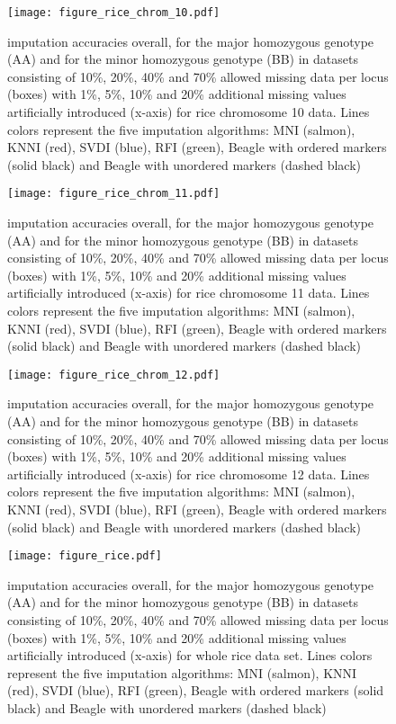 \begin{figure}\texttt{[image: figure\_rice\_chrom\_10.pdf]}\caption{
imputation accuracies overall, for the major homozygous genotype (AA) and for the minor homozygous genotype (BB) in datasets consisting of
10\%, 20\%, 40\% and 70\% allowed missing data per locus (boxes) with 1\%, 5\%, 10\% and 20\%
additional missing values artificially introduced (x-axis) for rice chromosome 10 data.
Lines colors represent the five imputation algorithms: MNI (salmon), KNNI (red), SVDI (blue), RFI (green), Beagle with ordered markers (solid black) and Beagle with unordered markers (dashed black)}\end{figure}
\begin{figure}\texttt{[image: figure\_rice\_chrom\_11.pdf]}\caption{
imputation accuracies overall, for the major homozygous genotype (AA) and for the minor homozygous genotype (BB) in datasets consisting of
10\%, 20\%, 40\% and 70\% allowed missing data per locus (boxes) with 1\%, 5\%, 10\% and 20\%
additional missing values artificially introduced (x-axis) for rice chromosome 11 data.
Lines colors represent the five imputation algorithms: MNI (salmon), KNNI (red), SVDI (blue), RFI (green), Beagle with ordered markers (solid black) and Beagle with unordered markers (dashed black)}\end{figure}

\begin{figure}\texttt{[image: figure\_rice\_chrom\_12.pdf]}\caption{
imputation accuracies overall, for the major homozygous genotype (AA) and for the minor homozygous genotype (BB) in datasets consisting of
10\%, 20\%, 40\% and 70\% allowed missing data per locus (boxes) with 1\%, 5\%, 10\% and 20\%
additional missing values artificially introduced (x-axis) for rice chromosome 12 data.
Lines colors represent the five imputation algorithms: MNI (salmon), KNNI (red), SVDI (blue), RFI (green), Beagle with ordered markers (solid black) and Beagle with unordered markers (dashed black)}\end{figure}

\begin{figure}\texttt{[image: figure\_rice.pdf]}\caption{
imputation accuracies overall, for the major homozygous genotype (AA) and for the minor homozygous genotype (BB) in datasets consisting of
10\%, 20\%, 40\% and 70\% allowed missing data per locus (boxes) with 1\%, 5\%, 10\% and 20\%
additional missing values artificially introduced (x-axis) for whole rice data set.
Lines colors represent the five imputation algorithms: MNI (salmon), KNNI (red), SVDI (blue), RFI (green), Beagle with ordered markers (solid black) and Beagle with unordered markers (dashed black)}\end{figure}













 




